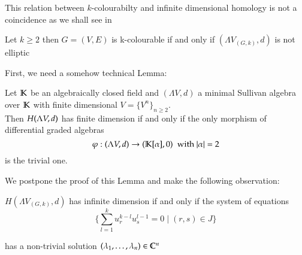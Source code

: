 This relation between $k$-colourabilty and infinite dimensional homology is not a coincidence as we shall see in

 \begin{Theorem}
 \label{thm:KColourEquivalentToNonEllipticity}
  Let $k \geq 2$ then 
   $G = (V,E)$ is k-colourable if and only if $(\Lambda V_{(G,k)},d)$ is not elliptic
 \end{Theorem}
 
 First, we need a somehow technical Lemma:
 \begin{Lemma}
 \label{lma:IfAndOnlyIfNonTrivialMorphism}
  Let $\mathbb{K}$ be an algebraically closed field and $(\Lambda V,d)$ a minimal Sullivan
  algebra over $\mathbb{K}$ with finite dimensional $V = {\lbrace V^n \rbrace}_{n \geq 2}$. \\ Then
  $H(\Lambda V,d)$ has finite dimension if and only if   
  the only morphism of differential graded algebras 
  $$ \varphi : (\Lambda V,d) \to (\mathbb{K}[\alpha],0) \; \text{ with $|\alpha| = 2$} $$ 
  is the trivial one.
 \end{Lemma}
  
  We postpone the proof of this Lemma and make the following observation:
  
 
\begin{Lemma}
\label{lma:cohomoly+equations}
 $H(\Lambda V_{(G,k)}, d)$ has infinite dimension if and only if the system of equations \\
 \begin{equation}
 \label{systemofequations}
 {\lbrace \sum_{l = 1}^k u_r^{k - l} u_s^{l - 1} = 0 \; | \; (r,s) \in J \rbrace}  
 \end{equation}
 
 has a non-trivial solution 
 $(\lambda_1 , \dotsc, \lambda_n) \in \mathbb{C}^n$
\end{Lemma}

